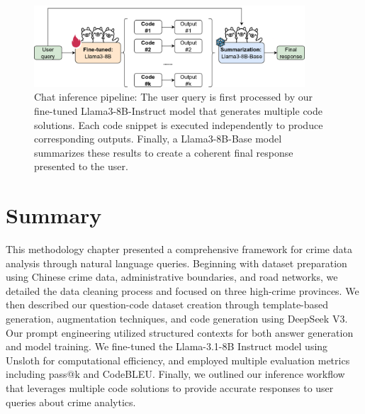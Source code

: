 \begin{figure}[H]
  \centering
  \includegraphics[width=0.9\textwidth]{images/inference_pipeline.drawio.png}
  \caption{Chat inference pipeline: The user query is first processed by our fine-tuned Llama3-8B-Instruct model that generates multiple code solutions. Each code snippet is executed independently to produce corresponding outputs. Finally, a Llama3-8B-Base model summarizes these results to create a coherent final response presented to the user.}
  \label{fig:inference_pipeline}
\end{figure}

\section{Summary}

This methodology chapter presented a comprehensive framework for crime data analysis through natural language queries. Beginning with dataset preparation using Chinese crime data, administrative boundaries, and road networks, we detailed the data cleaning process and focused on three high-crime provinces. We then described our question-code dataset creation through template-based generation, augmentation techniques, and code generation using DeepSeek V3. Our prompt engineering utilized structured contexts for both answer generation and model training. We fine-tuned the Llama-3.1-8B Instruct model using Unsloth for computational efficiency, and employed multiple evaluation metrics including pass@k and CodeBLEU. Finally, we outlined our inference workflow that leverages multiple code solutions to provide accurate responses to user queries about crime analytics.
